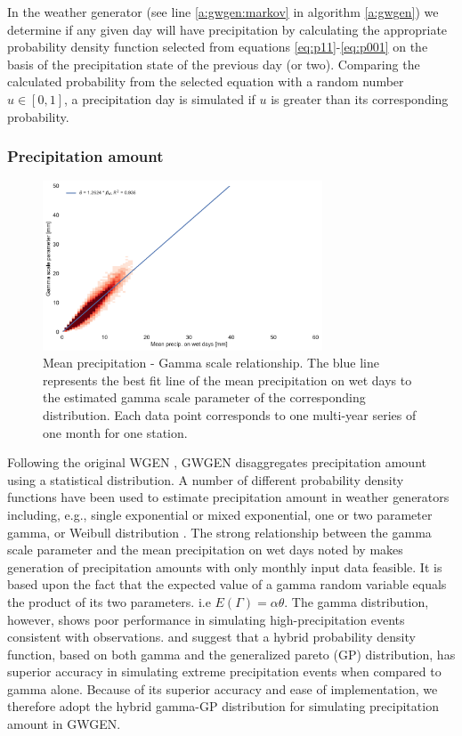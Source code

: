 \begin{refsection}
In the weather generator (see line \ref{a:gwgen:markov} in algorithm \ref{a:gwgen}) we determine if any given day will have precipitation by calculating the appropriate probability density function selected from  equations \eqref{eq:p11}-\eqref{eq:p001} on the basis of the precipitation state of the previous day (or two). Comparing the calculated probability from the selected equation with a random number $u\in[0, 1]$, a precipitation day is simulated if $u$ is greater than its corresponding probability.

\subsubsection{Precipitation amount} \label{sec:dist_params}

\begin{figure}
	\includegraphics[width=8.3cm]{Figures/f04.pdf}
	\caption[Mean precipitation - Gamma scale relationship]{Mean precipitation - Gamma scale relationship. The blue line represents the best fit line of the mean precipitation on wet days to the estimated gamma scale parameter of the corresponding distribution. Each data point corresponds to one multi-year series of one month for one station.}
	\label{fig:gscale_meanw}
\end{figure}

Following the original WGEN \citep{Richardson1981}, GWGEN disaggregates precipitation amount using a statistical distribution. A number of different probability density functions have been used to estimate precipitation amount in weather generators including, e.g., single exponential or mixed exponential, one or two parameter gamma, or Weibull distribution \citep{WilksWilby1999}. The strong relationship between the gamma scale parameter and the mean precipitation on wet days noted by \cite{GengDevriesSupit1986} makes generation of precipitation amounts with only monthly input data feasible. It is based upon the fact that the expected value of a gamma random variable equals the product of its two parameters. i.e $E(\Gamma) = \alpha\theta$. The gamma distribution, however, shows poor performance in simulating high-precipitation events consistent with observations. \cite{FurrerKatz2008} and \cite{NeykovNeytchevZucchini2014} suggest that a hybrid probability density function, based on both gamma and the generalized pareto (GP) distribution, has superior accuracy in simulating extreme precipitation events when compared to gamma alone. Because of its superior accuracy and ease of implementation, we therefore adopt the hybrid gamma-GP distribution for simulating precipitation amount in GWGEN.


\end{refsection}
